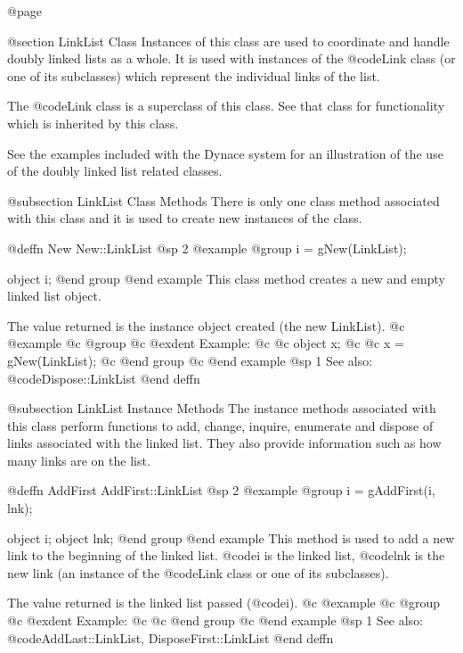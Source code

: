 @page

@section LinkList Class
Instances of this class are used to coordinate and handle doubly linked
lists as a whole.  It is used with instances of the @code{Link} class
(or one of its subclasses) which represent the individual links of
the list.

The @code{Link} class is a superclass of this class.  See that class
for functionality which is inherited by this class.

See the examples included with the Dynace system for an illustration of the
use of the doubly linked list related classes.


@subsection LinkList Class Methods
There is only one class method associated with this class and it is used
to create new instances of the class.







@deffn {New} New::LinkList
@sp 2
@example
@group
i = gNew(LinkList);

object  i;
@end group
@end example
This class method creates a new and empty linked list object.

The value returned is the instance object created (the new LinkList).
@c @example
@c @group
@c @exdent Example:
@c 
@c object  x;
@c 
@c x = gNew(LinkList);
@c @end group
@c @end example
@sp 1
See also:  @code{Dispose::LinkList}
@end deffn






@subsection LinkList Instance Methods
The instance methods associated with this class perform functions to
add, change, inquire, enumerate and dispose of links associated with the
linked list.  They also provide information such as how many links are
on the list.








@deffn {AddFirst} AddFirst::LinkList
@sp 2
@example
@group
i = gAddFirst(i, lnk);

object  i;
object  lnk;
@end group
@end example
This method is used to add a new link to the beginning of the linked list.
@code{i} is the linked list, @code{lnk} is the new link (an instance of
the @code{Link} class or one of its subclasses).

The value returned is the linked list passed (@code{i}).
@c @example
@c @group
@c @exdent Example:
@c 
@c @end group
@c @end example
@sp 1
See also:  @code{AddLast::LinkList, DisposeFirst::LinkList}
@end deffn










